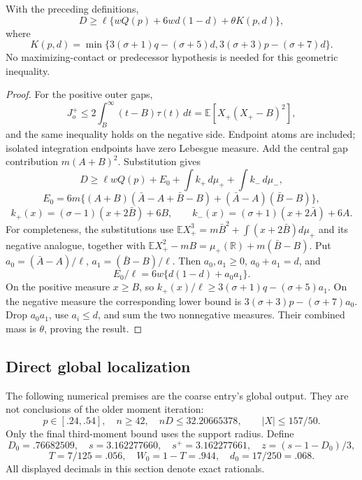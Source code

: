 \begin{proposition}\label{v10:geometry:cost}
With the preceding definitions,
\begin{equation}\label{v10:geometry:direct}
 D\ge\ell\{wQ(p)+6wd(1-d)+\theta K(p,d)\},
\end{equation}
where
\[
 K(p,d)=\min\{3(\sigma+1)q-(\sigma+5)d,
                    3(\sigma+3)p-(\sigma+7)d\}.
\]
No maximizing-contact or predecessor hypothesis is needed for this
geometric inequality.
\end{proposition}
\begin{proof}
For the positive outer gaps,
\[
 J_o^+\le2\int_B^\infty(t-B)\tau(t)\,dt
       =\mathbb E[X_+(X_+-B)^2],
\]
and the same inequality holds on the negative side. Endpoint atoms are
included; isolated integration endpoints have zero Lebesgue measure.
Add the central gap contribution $m(A+B)^2$. Substitution gives
\[
 D\ge \ell wQ(p)+E_0+\int k_+\,d\mu_++\int k_-\,d\mu_-,
\]
\[
 E_0=6m\{(A+B)(\bar A-A+\bar B-B)+(\bar A-A)(\bar B-B)\},
\]
\[
 k_+(x)=(\sigma-1)(x+2\bar B)+6B,\qquad
 k_-(x)=(\sigma+1)(x+2\bar A)+6A.
\]
For completeness, the substitutions use
$\mathbb EX_+^3=m\bar B^2+\int(x+2\bar B)d\mu_+$ and its negative
analogue, together with
$\mathbb EX_+^2-mB=\mu_+(\mathbb R)+m(\bar B-B)$.
Put $a_0=(\bar A-A)/\ell$, $a_1=(\bar B-B)/\ell$. Then
$a_0,a_1\ge0$, $a_0+a_1=d$, and
\[
 E_0/\ell=6w\{d(1-d)+a_0a_1\}.
\]
On the positive measure $x\ge B$, so
$k_+(x)/\ell\ge3(\sigma+1)q-(\sigma+5)a_1$.
On the negative measure the corresponding lower bound is
$3(\sigma+3)p-(\sigma+7)a_0$.
Drop $a_0a_1$, use $a_i\le d$, and sum the two nonnegative measures.
Their combined mass is $\theta$, proving the result.
\end{proof}

\subsection{Direct global localization}
The following numerical premises are the coarse entry's global output.
They are not conclusions of the older moment iteration:
\begin{equation}\label{v10:geometry:input}
 p\in[.24,.54],\quad n\ge42,\quad nD\le32.20665378,
 \qquad |X|\le157/50.
\end{equation}
Only the final third-moment bound uses the support radius. Define
\[
 D_0=.76682509,\quad s=3.162277660,\quad s^+=3.162277661,
 \quad z=(s-1-D_0)/3,
\]
\[
 T=7/125=.056,\quad W_0=1-T=.944,\quad d_0=17/250=.068.
\]
All displayed decimals in this section denote exact rationals.

